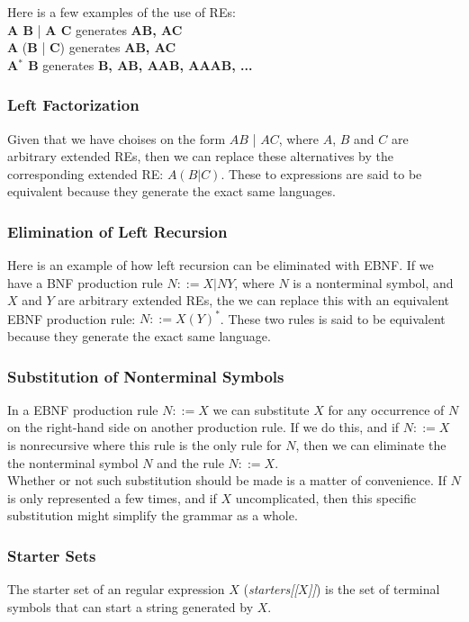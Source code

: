 Here is a few examples of the use of REs: \\
\textbf{A B} | \textbf{A C} generates \textbf{{AB, AC}} \\
\textbf{A} (\textbf{B} | \textbf{C}) generates \textbf{{AB, AC}} \\
\textbf{A$^*$ B} generates \textbf{{B, AB, AAB, AAAB, ...}} \\


\subsubsection*{Left Factorization}
Given that we have choises on the form $A B$ | $A C$, where $A$, $B$ and $C$ are arbitrary extended REs, then we can replace these alternatives by the corresponding extended RE: $A (B | C)$. These to expressions are said to be equivalent because they generate the exact same languages.

\subsubsection*{Elimination of Left Recursion}
Here is an example of how left recursion can be eliminated with EBNF. If we have a BNF production rule $N ::= X | N Y$, where $N$ is a nonterminal symbol, and $X$ and $Y$ are arbitrary extended REs, the we can replace this with an equivalent EBNF production rule: $N ::= X (Y)^*$. These two rules is said to be equivalent because they generate the exact same language.

\subsubsection*{Substitution of Nonterminal Symbols}
In a EBNF production rule $N::=X$ we can substitute $X$ for any occurrence of $N$ on the right-hand side on another production rule. If we do this, and if $N::=X$ is nonrecursive where this rule is the only rule for $N$, then we can eliminate the the nonterminal symbol $N$ and the rule $N::=X$.\\ \indent
Whether or not such substitution should be made is a matter of convenience. If $N$ is only represented a few times, and if $X$ uncomplicated, then this specific substitution might simplify the grammar as a whole.

\subsubsection*{Starter Sets}
The starter set of an regular expression $X$ (\textit{starters[[$X$]]}) is the set of terminal symbols that can start a string generated by $X$.